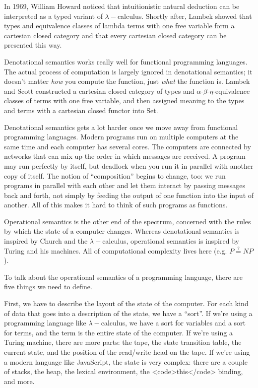 \documentclass[a4paper,UKenglish]{article}
\begin{document}
In 1969, William Howard noticed that intuitionistic natural deduction can be interpreted as a typed variant of $\lambda-$calculus.  Shortly after, Lambek showed that types and equivalence classes of lambda terms with one free variable form a cartesian closed category and that every cartesian closed category can be presented this way.


Denotational semantics works really well for functional programming languages.  The actual process of computation is largely ignored in denotational semantics; it doesn't matter {\em how} you compute the function, just {\em what} the function is.  Lambek and Scott \cite{LambekScott} constructed a cartesian closed category of types and $\alpha$-$\beta$-$\eta$-equivalence classes of terms with one free variable, and then assigned meaning to the types and terms with a cartesian closed functor into Set.

Denotational semantics gets a lot harder once we move away from functional programming languages.  Modern programs run on multiple computers at the same time and each computer has several cores. The computers are connected by networks that can mix up the order in which messages are received.  A program may run perfectly by itself, but deadlock when you run it in parallel with another copy of itself.  The notion of ``composition'' begins to change, too: we run programs in parallel with each other and let them interact by passing messages back and forth, not simply by feeding the output of one function into the input of another.  All of this makes it hard to think of such programs as functions.

Operational semantics is the other end of the spectrum, concerned with the rules by which the state of a computer changes.  Whereas denotational semantics is inspired by Church and the $\lambda-$calculus, operational semantics is inspired by Turing and his machines.  All of computational complexity lives here (e.g. $P \stackrel{?}{=} NP$).

To talk about the operational semantics of a programming language, there are five things we need to define.

First, we have to describe the layout of the state of the computer. For each kind of data that goes into a description of the state, we have a ``sort''.  If we're using a programming language like $\lambda-$calculus, we have a sort for variables and a sort for terms, and the term is the entire state of the computer.  If we're using a Turing machine, there are more parts: the tape, the state transition table, the current state, and the position of the read/write head on the tape.  If we're using a modern language like JavaScript, the state is very complex: there are a couple of stacks, the heap, the lexical environment, the <code>this</code> binding, and more.
\end{document}
